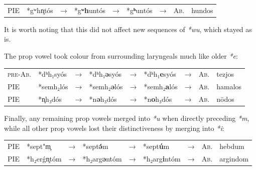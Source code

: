 \documentclass[svgnames,x11names,b5paper]{book}
\begin{document}
            \begin{table}[H]
                \begin{center}
                \begin{tabular}{llcllllll}
                \textsc{PIE} & *gʷhn̥tós & → & *g\textbf{ʷh}untós & → & *g\textbf{ʰ}untós & → & \textsc{Ab.} & hundos\\
                \end{tabular}
                \end{center}
                \end{table}
        
            It is worth noting that this did not affect new sequences of \textit{*wu}, which stayed as is.

        The prop vowel took colour from surrounding laryngeals much like older \textit{*e}:

            \begin{table}[H]
                \begin{center}
                \begin{tabular}{llcllllll}
                \textsc{pre-Ab.} & *dʰh₁syós & → & *dʰh₁\textbf{ǝ}syós & → & *dʰh₁\textbf{e}syós & → & \textsc{Ab.} & tezjos\\
                \textsc{PIE} & *semh₂lós & → & *semh₂\textbf{ǝ}lós & → & *semh₂\textbf{a}lós & → & \textsc{Ab.} & hamalos\\
                \textsc{PIE} & *n̥h₃dós & → & *n\textbf{ǝ}h₃dós & → & *n\textbf{o}h₃dós & → & \textsc{Ab.} & nōdos\\
                \end{tabular}
                \end{center}
                \end{table}
        
        Finally, any remaining prop vowels merged into \textit{*u} when directly preceding \textit{*m}, while all other prop vowels lost their distinctiveness by merging into \textit{*i}:

            \begin{table}[H]
                \begin{center}
                \begin{tabular}{llcllllll}
                \textsc{PIE} & *sept"m̥ & → & *sept\textbf{ǝ́}m & → & *sept\textbf{ú}m & → & \textsc{Ab.} & hebdum\\
                \textsc{PIE} & *h₂erǵn̥tóm & → & *h₂arg\textbf{ǝ}ntóm & → & *h₂arg\textbf{i}ntóm & → & \textsc{Ab.} & argindom\\
                \end{tabular}
                \end{center}
                \end{table}
        
\end{document}
